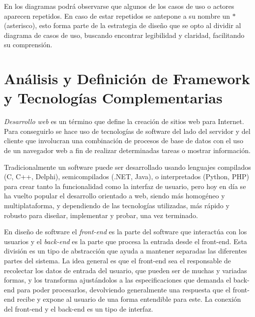 \documentclass[11pt,oneside]{book}
\begin{document}
En los diagramas podrá observarse que algunos de los casos de uso o actores aparecen repetidos. En caso de estar repetidos se antepone a su nombre un \textbf{$*$} (asterisco), esto forma parte de la estrategia de diseño que se opto al dividir al diagrama de casos de uso, buscando encontrar legibilidad y claridad, facilitando su comprensión.

\section{Análisis y Definición de Framework y Tecnologías Complementarias}

\textit{Desarrollo web} es un término que define la creación de sitios web para Internet. Para conseguirlo se hace uso de tecnologías de software del lado del servidor y del cliente que involucran una combinación de procesos de base de datos con el uso de un navegador web a fin de realizar determinadas tareas o mostrar información.

Tradicionalmente un software puede ser desarrollado usando lenguajes compilados (C, C++, Delphi), semicompilados (.NET, Java), o interpretados (Python, PHP) para crear tanto la funcionalidad como la interfaz de usuario, pero hoy en día se ha vuelto popular el desarrollo orientado a web, siendo más homogéneo y multiplataforma, y dependiendo de las tecnologías utilizadas, más rápido y robusto para diseñar, implementar y probar, una vez terminado.

En diseño de software el \textit{front-end} es la parte del software que interactúa con los usuarios y el \textit{back-end} es la parte que procesa la entrada desde el front-end. Esta división es un tipo de abstracción que ayuda a mantener separadas las diferentes partes del sistema. La idea general es que el front-end sea el responsable de recolectar los datos de entrada del usuario, que pueden ser de muchas y variadas formas, y los transforma ajustándolos a las especificaciones que demanda el back-end para poder procesarlos, devolviendo generalmente una respuesta que el front-end recibe y expone al usuario de una forma entendible para este. La conexión del front-end y el back-end es un tipo de interfaz.
\end{document}

